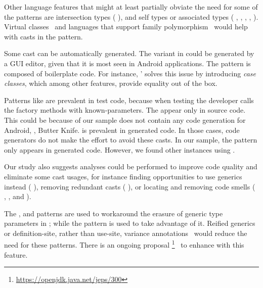 Other language features that might at least partially obviate the need for some of the patterns are
intersection types (\cf{} ),
and self types or associated types (\cf{} 
,
,
,
,
).
Virtual classes~\citep{gbeta, scalaIndependentlyExtensible} and languages that support family polymorphism~\citep{ernstFamilyPolymorphism2001}
would help with casts in the  pattern.

Some cast can be automatically generated.
The  variant in  could be generated by a GUI editor,
given that it is most seen in Android applications.
The  pattern is composed of boilerplate code.
For instance, \scala{}' solves this issue by introducing \emph{case classes},
which among other features, provide equality out of the box.

Patterns like  are prevalent in test code,
because when testing the developer calls the factory methods with known-parameters.
The  appear only in source code.
This could be because of our sample does not contain any code generation for Android,
\eg{}, Butter Knife.
 is prevalent in generated code.
In those cases, code generators do not make the effort to avoid these casts.
In our sample, the  pattern only appears in generated code.
However, we found other instances using \ql{}.

Our study also suggests analyses could be performed to improve code quality and eliminate some cast usages,
for instance finding opportunities to use generics instead (\cf{} ),
removing redundant casts (\cf{} ),
or locating and removing code smells (\cf{}
,
, and
).

The
,
 and
patterns are used to workaround the erasure of generic type parameters in \java{};
while the  pattern is used to take advantage of it.
Reified generics or definition-site, rather than use-site,
variance annotations~\citep{altidorTamingWildcardsCombining2011}
would reduce the need for these patterns.
There is an ongoing proposal%
\footnote{\url{https://openjdk.java.net/jeps/300}}~\citep{jep300}
to enhance \java{} with this feature.

